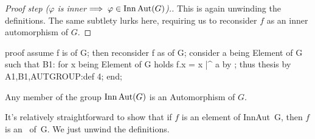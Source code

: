 \begin{proof}[Proof step ($\varphi$ is inner$\implies\varphi\in\operatorname{Inn}\operatorname{Aut}(G)$).]
This is again unwinding the definitions. The same subtlety lurks here,
requiring us to reconsider $f$ as an inner automorphism of $G$.
\end{proof}

\nwenddocs{}\endmoddef\nwstartdeflinemarkup{}\nwenddeflinemarkup
proof
  assume f is   of G;
  then reconsider f as   of G;
  consider a being Element of G such that
  B1: for x being Element of G holds f.x = x |^ a
  by ;
  thus thesis by A1,B1,AUTGROUP:def 4;
end;
\nwendcode{}\nwdocspar

\begin{lemma}
Any member of the group $\operatorname{Inn}\operatorname{Aut}(G)$ is an Automorphism of $G$.
\end{lemma}

It's relatively straightforward to show that if $f$ is an element of
{\Tt{}InnAut\ G\nwendquote}, then $f$ is an {\Tt{}\ of\ G\nwendquote}. We just unwind the
definitions.

